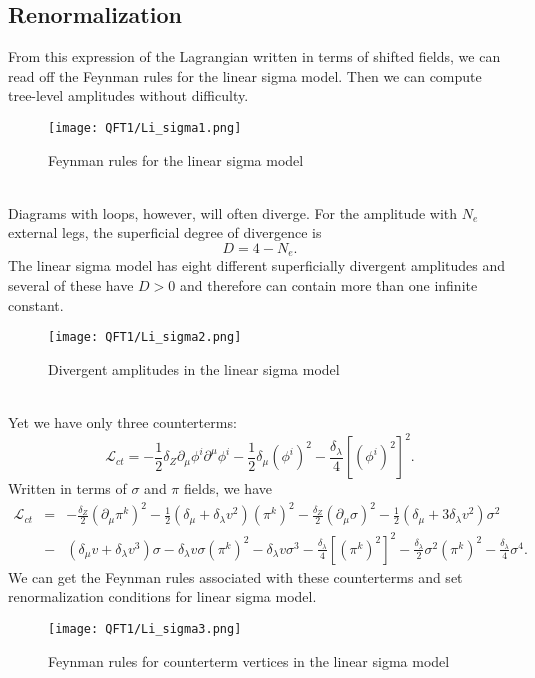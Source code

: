 \subsection{Renormalization}
From this expression of the Lagrangian written in terms of shifted fields, we can read off the Feynman rules for the linear sigma model. Then we can compute tree-level amplitudes without difficulty.
\\
\begin{figure}[!h]
\centering
\texttt{[image: QFT1/Li\_sigma1.png]}
\caption{Feynman rules for the linear sigma model}
\end{figure}
\\
Diagrams with loops, however, will often diverge. For the amplitude with $N_e$ external legs, the superficial degree of divergence is
\[D = 4 - N_e.\]
The linear sigma model has eight different superficially divergent amplitudes and several of these have $D > 0$ and therefore can contain more than one infinite constant.
\\
\begin{figure}[!h]
\centering
\texttt{[image: QFT1/Li\_sigma2.png]}
\caption{Divergent amplitudes in the linear sigma model}
\end{figure}
\\
Yet we have only three counterterms:
\[\mathcal{L}_{ct} = -\frac{1}{2} \delta_Z \partial_{\mu} \phi^i \partial^{\mu}\phi^i - \frac{1}{2} \delta_{\mu} (\phi^i)^2 - \frac{\delta_{\lambda}}{4} [(\phi^i)^2]^2 .\]
Written in terms of $\sigma$ and $\pi$ fields, we have
\begin{eqnarray}
\mathcal{L}_{ct} &=& -\frac{\delta_Z}{2}(\partial_{\mu}\pi^k)^2 - \frac{1}{2}(\delta_{\mu}+\delta_{\lambda}v^2)(\pi^k)^2 -\frac{\delta_Z}{2}(\partial_{\mu}\sigma)^2 - \frac{1}{2}(\delta_{\mu} + 3\delta_{\lambda}v^2)\sigma^2 \nonumber \\
&-& (\delta_{\mu}v + \delta_{\lambda}v^3)\sigma - \delta_{\lambda}v\sigma(\pi^k)^2 - \delta_{\lambda}v\sigma^3 - \frac{\delta_{\lambda}}{4}[(\pi^k)^2]^2 - \frac{\delta_{\lambda}}{2}\sigma^2 (\pi^k)^2 - \frac{\delta_{\lambda}}{4}\sigma^4 .\nonumber
\end{eqnarray}
We can get the Feynman rules associated with these counterterms and set renormalization conditions for linear sigma model.
\begin{figure}[!h]
\centering
\texttt{[image: QFT1/Li\_sigma3.png]}
\caption{Feynman rules for counterterm vertices in the linear sigma model}
\end{figure}
